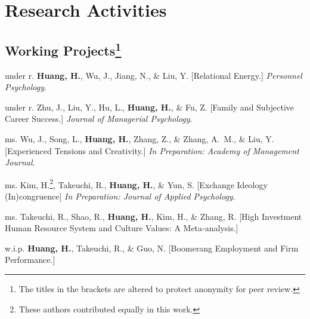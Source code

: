 \documentclass[12pt,letterpaper]{report} %
\begin{document}
    \section*{Research Activities}
    \subsection*{Working Projects\footnote{The titles in the brackets are altered to protect anonymity for peer review.}}

    \begin{tablist}

        \item[under r.]\tab{}\textbf{Huang, H.}, Wu, J., Jiang, N., \& Liu, Y. [Relational Energy.] \textit{Personnel Psychology}.
        
        \item[under r.]\tab{}Zhu, J., Liu, Y., Hu, L., \textbf{Huang, H.}, \& Fu, Z. [Family and Subjective Career Success.] \textit{Journal of Managerial Psychology}.

        \item[ms.]\tab{}Wu, J., Song, L., \textbf{Huang, H.},  Zhang, Z., \& Zhang, A.~M., \& Liu, Y. [Experienced Tensions and Creativity.]  \textit{In Preparation: Academy of Management Journal}.
        
        \item[ms.]\tab{}Kim, H.\footnote{\label{fn:eqauth}These authors contributed equally in this work.}, Takeuchi, R., \textbf{Huang, H.}, \& Yun, S. [Exchange Ideology (In)congruence] \textit{In Preparation: Journal of Applied Psychology}.

        \item[ms.]\tab{}Takeuchi, R., Shao, R., \textbf{Huang, H.}, Kim, H., \& Zhang, R. [High Investment Human Resource System and Culture Values: A Meta-analysis.] %

        \item[w.i.p.]\tab{}\textbf{Huang, H.}, Takeuchi, R., \& Guo, N. [Boomerang Employment and Firm Performance.] %


    \end{tablist}



\end{document}
